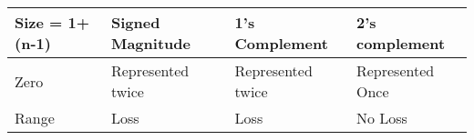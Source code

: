 \begin{enumerate}
\begin{minipage}{\linewidth}
    \begin{myTableStyle} \begin{tabular}{ |m{3cm}|m{3cm}|m{3cm}|m{3cm}| } \hline
        Size = 1+ (n-1)     & Signed Magnitude           & 1's Complement       & 2's complement        \\ \hline
        Zero                & Represented twice          & Represented twice    & Represented Once      \\ \hline
        Range               & Loss                       & Loss                 & No Loss               \\ \hline
    \end{tabular} \end{myTableStyle} \vspace{0.08in}
    \end{minipage}

\end{enumerate}
